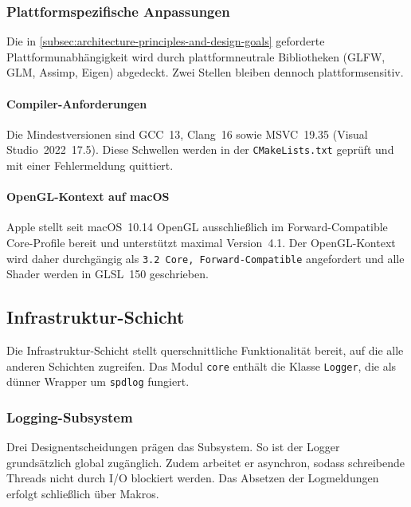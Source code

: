             \subsubsection{Plattformspezifische Anpassungen}\label{subsubsec:impl-medusa-platform-specifics}
                Die in \cref{subsec:architecture-principles-and-design-goals} geforderte Plattformunabhängigkeit wird durch plattformneutrale Bibliotheken (GLFW, GLM, Assimp, Eigen) abgedeckt.
                Zwei Stellen bleiben dennoch plattformsensitiv.

                \paragraph{Compiler-Anforderungen}\label{para:impl-medusa-platform-compilers}
                    Die Mindestversionen sind GCC~13, Clang~16 sowie MSVC~19.35 (Visual Studio~2022~17.5).
                    Diese Schwellen werden in der \texttt{CMakeLists.txt} geprüft und mit einer Fehlermeldung quittiert.

                \paragraph{OpenGL-Kontext auf macOS}\label{para:impl-medusa-platform-macos-gl}
                    Apple stellt seit macOS~10.14 OpenGL ausschließlich im Forward-Compatible Core-Profile bereit und unterstützt maximal Version~4.1.
                    Der OpenGL-Kontext wird daher durchgängig als \texttt{3.2 Core, Forward-Compatible} angefordert und alle Shader werden in GLSL~150 geschrieben.

        \subsection{Infrastruktur-Schicht}\label{subsec:impl-medusa-infrastructure}
            Die Infrastruktur-Schicht stellt querschnittliche Funktionalität bereit, auf die alle anderen Schichten zugreifen.
            Das Modul \texttt{core} enthält die Klasse \texttt{Logger}, die als dünner Wrapper um \texttt{spdlog} fungiert.

            \subsubsection{Logging-Subsystem}\label{subsubsec:impl-medusa-logging}
                Drei Designentscheidungen prägen das Subsystem.
                So ist der Logger grundsätzlich global zugänglich.
                Zudem arbeitet er asynchron, sodass schreibende Threads nicht durch I/O blockiert werden.
                Das Absetzen der Logmeldungen erfolgt schließlich über Makros.

